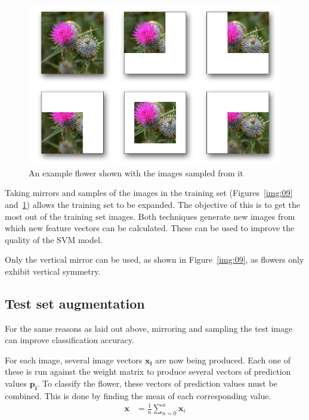 \documentclass[11pt, a4paper]{report}
\newcommand{\vect}[1]{\boldsymbol{#1}}
\begin{document}
\begin{figure}[hbt]
	\centering
  \includegraphics[totalheight=8cm]{img/10.png}
  \caption{An example flower shown with the images sampled from it}
  \label{img:10}
\end{figure}

Taking mirrors and samples of the images in the training set (Figures~\ref{img:09} and~\ref{img:10}) allows the training set to be expanded. The objective of this is to get the most out of the training set images. Both techniques generate new images from which new feature vectors can be calculated. These can be used to improve the quality of the SVM model. 

Only the vertical mirror can be used, as shown in Figure~\ref{img:09}, as flowers only exhibit vertical symmetry. 


\subsection{Test set augmentation}
\label{sec:test_augmentation}

For the same reasons as laid out above, mirroring and sampling the test image can improve classification accuracy.

For each image, several image vectors $\vect{x_{i}}$ are now being produced. Each one of these is run against the weight matrix to produce several vectors of prediction values $\vect{p_{i}}$. To classify the flower, these vectors of prediction values must be combined. This is done by finding the mean of each corresponding value.%
$$
\begin{aligned}
	\vect{x} &= \frac{1}{n} \sum_{n = 0}^{n} \vect{x}_{i} \\
\end{aligned}
$$
\end{document}
